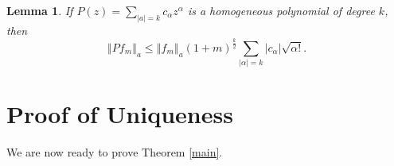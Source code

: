 \documentclass[12pt]{amsart}
\newtheorem{lemma}[theorem]{Lemma}
\begin{document}
\begin{lemma}
	\label{lemmaD} If $P\left(  z \right)  = {\displaystyle\sum_{\left\vert
			a\right\vert =k}} c_{\alpha}z^{\alpha}$ is a homogeneous polynomial of degree
	$k$, then
	\[
	\left\Vert Pf_{m}\right\Vert _{a}\leq\left\Vert f_{m}\right\Vert _{a}\left(
	1+m\right)  ^{\frac{k}{2}} {\displaystyle\sum_{\left\vert \alpha\right\vert
			=k}} \left\vert c_{\alpha}\right\vert \sqrt{\alpha!}.
	\]
	
\end{lemma}

\section{Proof of Uniqueness}

We are now ready to prove Theorem \ref{main}.
\end{document}

